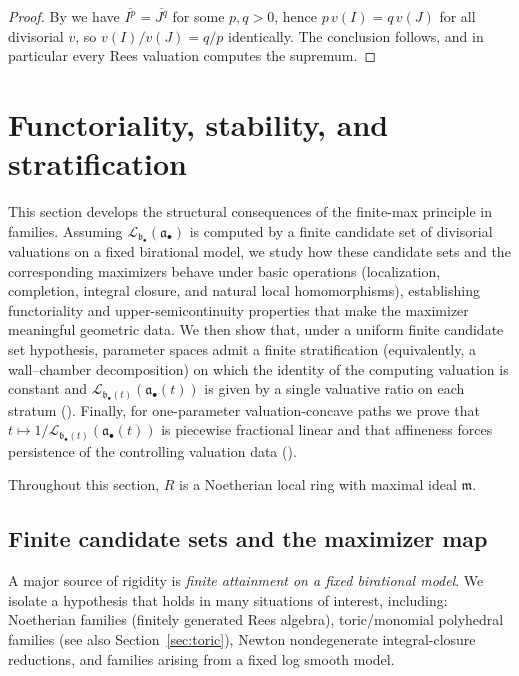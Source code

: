 \documentclass[12pt]{amsart}
\newcommand{\m}{\mathfrak m}
\renewcommand{\a}{\mathfrak{a}}
\renewcommand{\b}{\mathfrak{b}}
\newcommand{\Loj}{\mathcal{L}} %
\newcommand{\abul}{{\a_\bullet}}
\newcommand{\bbul}{{\b_\bullet}}
\theoremstyle{plain}
\theoremstyle{definition}
\numberwithin{equation}{section}
\begin{document}
\begin{proof}
	By  we have
	$\overline{I^p}=\overline{J^q}$ for some $p,q>0$, hence $p\,v(I)=q\,v(J)$ for all
	divisorial $v$, so $v(I)/v(J)=q/p$ identically.  The conclusion follows, and in
	particular every Rees valuation computes the supremum.
\end{proof}


\section{Functoriality, stability, and stratification}\label{sec:stability}

This section develops the structural consequences of the finite-max principle in families.  Assuming $\Loj_{\bbul}(\abul)$ is computed by a finite candidate set of divisorial valuations on a fixed birational model, we study how these candidate sets and the corresponding maximizers behave under basic operations (localization, completion, integral closure, and natural local homomorphisms), establishing functoriality and upper-semicontinuity properties that make the maximizer meaningful geometric data.  We then show that, under a uniform finite candidate set hypothesis, parameter spaces admit a finite stratification (equivalently, a wall--chamber decomposition) on which the identity of the computing valuation is constant and $\Loj_{\bbul(t)}(\abul(t))$ is given by a single valuative ratio on each stratum ().  Finally, for one-parameter valuation-concave paths we prove that $t\mapsto 1/\Loj_{\bbul(t)}(\abul(t))$ is piecewise fractional linear and that affineness forces persistence of the controlling valuation data ().

Throughout this section, $R$ is a Noetherian local ring with maximal ideal $\m$.


\subsection{Finite candidate sets and the maximizer map}

A major source of rigidity is \emph{finite attainment on a fixed birational model}.
We isolate a hypothesis that holds in many situations of interest, including:
Noetherian families (finitely generated Rees algebra),
toric/monomial polyhedral families (see also Section~\ref{sec:toric}),
Newton nondegenerate integral-closure reductions,
and families arising from a fixed log smooth model.
\end{document}
